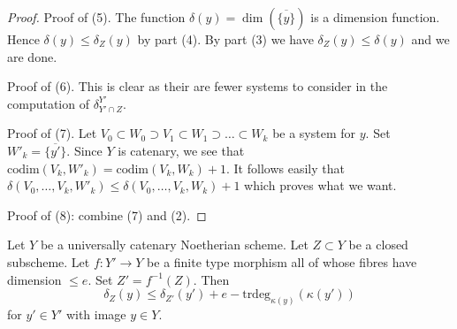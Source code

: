 \begin{proof}
\medskip\noindent
Proof of (5). The function $\delta(y) = \dim(\overline{\{y\}})$
is a dimension function. Hence $\delta(y) \leq \delta_Z(y)$ by
part (4). By part (3) we have $\delta_Z(y) \leq \delta(y)$
and we are done.

\medskip\noindent
Proof of (6). This is clear as their are fewer systems to consider
in the computation of $\delta^{Y'}_{Y' \cap Z}$.

\medskip\noindent
Proof of (7). Let
$V_0 \subset W_0 \supset V_1 \subset W_1 \supset \ldots \subset W_k$
be a system for $y$. Set $W'_k = \overline{\{y'\}}$.
Since $Y$ is catenary, we see that
$\text{codim}(V_k, W'_k) = \text{codim}(V_k, W_k) + 1$.
It follows easily that $\delta(V_0, \ldots, V_k, W'_k) \leq
\delta(V_0, \ldots, V_k, W_k) + 1$ which proves what we want.

\medskip\noindent
Proof of (8): combine (7) and (2).
\end{proof}

\begin{lemma}
\label{lemma-change-distance-function}
Let $Y$ be a universally catenary Noetherian scheme. Let $Z \subset Y$
be a closed subscheme. Let $f : Y' \to Y$ be a finite type
morphism all of whose fibres have dimension $\leq e$. Set $Z' = f^{-1}(Z)$.
Then
$$
\delta_Z(y) \leq \delta_{Z'}(y') + e - \text{trdeg}_{\kappa(y)}(\kappa(y'))
$$
for $y' \in Y'$ with image $y \in Y$.
\end{lemma}

